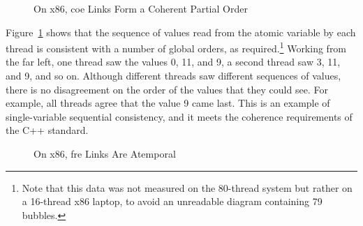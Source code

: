 \documentclass[10]{article}
\begin{document}
\begin{figure}[tb]
\begin{center}
\caption{On x86, coe Links Form a Coherent Partial Order}
\label{fig:On x86, coe Links Form a Coherent Partial Order}
\end{center}
\end{figure}

Figure~\ref{fig:On x86, coe Links Form a Coherent Partial Order} shows
that the sequence of values read from the atomic variable by each
thread is consistent with a number of global orders, as
required.\footnote{
	Note that this data was not measured on the 80-thread system but
	rather on a 16-thread x86 laptop, to avoid an unreadable diagram
	containing 79 bubbles.}
Working from the far left, one thread saw the values 0, 11, and 9,
a second thread saw 3, 11, and 9, and so on.
Although different threads saw different sequences of values, there is no
disagreement on the order of the values that they could see.
For example, all threads agree that the value 9 came last.
This is an example of single-variable sequential consistency, and it
meets the coherence requirements of the C++ standard.

\begin{figure}[tb]
\begin{center}
\caption{On x86, fre Links Are Atemporal}
\label{fig:On x86, fre Links Are Atemporal}
\end{center}
\end{figure}
\end{document}
